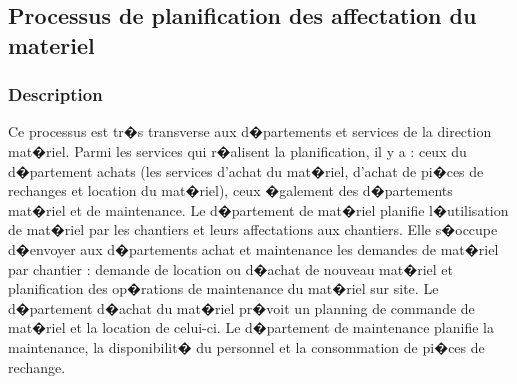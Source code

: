\documentclass{article}
\begin{document}
				
				
				
		\subsection{Processus de planification des affectation du materiel}
				\subsubsection{Description}
				
				Ce processus est tr�s transverse aux d�partements et services de la direction mat�riel.
				Parmi les services qui r�alisent la planification, il y a : ceux du d�partement achats (les services d'achat du mat�riel, d'achat de pi�ces de rechanges et location du mat�riel), ceux �galement des d�partements mat�riel et de maintenance.
				\newline
				Le d�partement de mat�riel planifie l�utilisation de mat�riel par les chantiers et leurs affectations aux chantiers. Elle s�occupe d�envoyer aux d�partements achat et maintenance les demandes de mat�riel par chantier : demande de location ou d�achat de nouveau mat�riel et planification des op�rations de maintenance du mat�riel sur site.
				\newline
				Le d�partement d�achat du mat�riel pr�voit un planning de commande de mat�riel et la location de celui-ci. 
				\newline
				Le d�partement de maintenance planifie la maintenance, la disponibilit� du personnel et la consommation de pi�ces de rechange.
				
				
				
\end{document}

